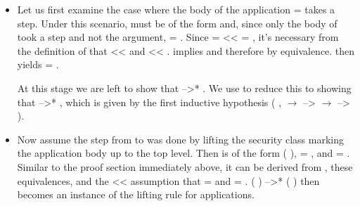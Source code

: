 \documentclass[12pt]{report}
\begin{document}
\begin{itemize}
\item  Let us first examine the case where the body of the application
     =    takes a step. Under this scenario,  must
    be of the form    and, since only the body of 
    took a step and not the argument,  = . Since  = 
      <<    = , it's necessary from the
    definition of  that  <<  and  <<
    .   implies   and therefore 
     by equivalence.  then yields 
    = .


    At this stage we are left to show that    -->* 
     . We use  to reduce this to
    showing that  -->* , which is given by the first
    inductive hypothesis (\coqdockw{\ensuremath{\forall}} ,   \ensuremath{\rightarrow}  -->  \ensuremath{\rightarrow}
     --> ).



\item  Now assume the step from  to  was done by lifting the
    security class marking the application body up to the top
    level. Then  is of the form   (  ),
     = , and  = . Similar to the proof section
    immediately above, it can be derived from  , these
    equivalences, and the  <<  assumption that  = 
    and  = .  (  )  -->*
      (  ) then becomes an instance of the
     lifting rule for applications.




\end{itemize}
\end{document}
